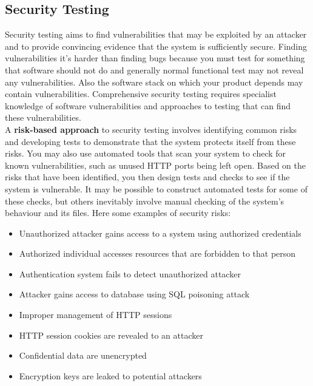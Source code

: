 \documentclass[10pt,a4paper]{report}
\begin{document}
\subsection{Security Testing}
 Security testing aims to find vulnerabilities that may be exploited by an
attacker and to provide convincing evidence that the system is
sufficiently secure. Finding vulnerabilities it's harder than finding bugs because you must test for something that software should not do and generally normal functional test may not reveal any vulnerabilities. Also the software stack on which your product depends may contain vulnerabilities. 
Comprehensive security testing requires specialist knowledge of
software vulnerabilities and approaches to testing that can find these
vulnerabilities.\\
A \textbf{risk-based approach} to security testing involves identifying common
risks and developing tests to demonstrate that the system protects itself
from these risks.
You may also use automated tools that scan your system to check for
known vulnerabilities, such as unused HTTP ports being left open.
Based on the risks that have been identified, you then design tests and
checks to see if the system is vulnerable.
It may be possible to construct automated tests for some of these
checks, but others inevitably involve manual checking of the system’s
behaviour and its files.
Here some examples of security risks:
\begin{itemize}
	\item Unauthorized attacker gains access to a
	system using authorized credentials
	\item Authorized individual accesses resources
	that are forbidden to that person
	\item Authentication system fails to detect
	unauthorized attacker
	\item Attacker gains access to database using
	SQL poisoning attack
	\item Improper management of HTTP sessions
	\item HTTP session cookies are revealed to an
	attacker
	\item Confidential data are unencrypted
	\item Encryption keys are leaked to potential
	attackers
\end{itemize}
\end{document}
